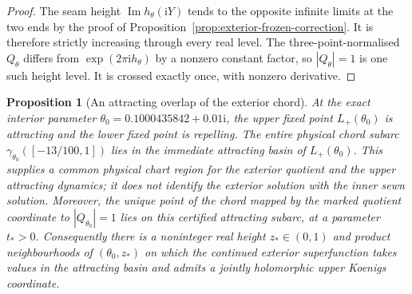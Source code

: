 \documentclass[11pt,a4paper]{article}
\newtheorem{proposition}[theorem]{Proposition}
\theoremstyle{definition}
\newcommand{\ii}{\mathrm{i}}
\begin{document}
\begin{proof}
The seam height $\operatorname{Im}h_\theta(\ii Y)$ tends to the
opposite infinite limits at the two ends by the proof of
Proposition~\ref{prop:exterior-frozen-correction}.
It is therefore strictly increasing through every real level.
The three-point-normalised $Q_\theta$ differs from
$\exp(2\pi\ii h_\theta)$ by a nonzero constant factor, so
$|Q_\theta|=1$ is one such height level.  It is crossed exactly
once, with nonzero derivative.
\end{proof}

\begin{proposition}[An attracting overlap of the exterior chord]
\label{prop:interior-chord-overlap}
At the exact interior parameter
$\theta_0=0.1000435842+0.01\ii$, the upper fixed point
$L_+(\theta_0)$ is attracting and the lower fixed point is
repelling.  The entire physical chord subarc
$\gamma_{\theta_0}([-13/100,1])$ lies in the immediate attracting
basin of $L_+(\theta_0)$.  This supplies a common physical chart
region for the exterior quotient and the upper attracting dynamics;
it does not identify the exterior solution with the inner sewn
solution.  Moreover, the unique point of the chord mapped by the
marked quotient coordinate to $|Q_{\theta_0}|=1$ lies on this
certified attracting subarc, at a parameter $t_*>0$.
Consequently there is a noninteger real height $z_*\in(0,1)$
and product neighbourhoods of $(\theta_0,z_*)$ on which the
continued exterior superfunction takes values in the attracting
basin and admits a jointly holomorphic upper Koenigs coordinate.
\end{proposition}
\end{document}
